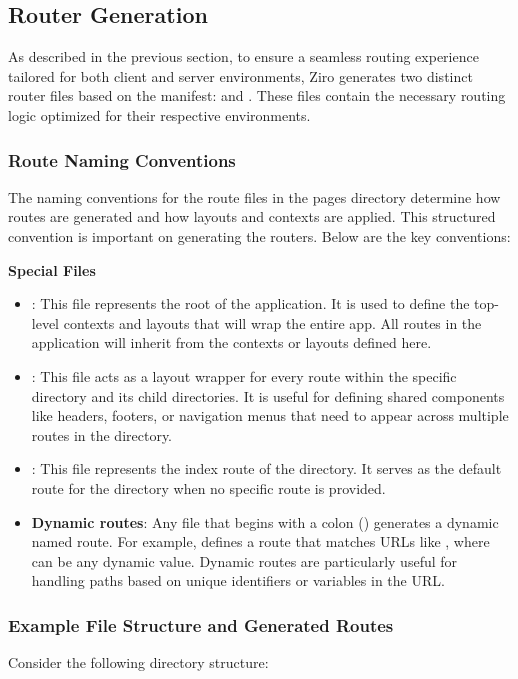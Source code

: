 \subsection{Router Generation}

As described in the previous section, to ensure a seamless routing experience tailored for both client and server environments, Ziro generates two distinct router files based on the manifest:  and . These files contain the necessary routing logic optimized for their respective environments.

\subsubsection{Route Naming Conventions}
The naming conventions for the route files in the pages directory determine how routes are generated and how layouts and contexts are applied. This structured convention is important on generating the routers. Below are the key conventions:

\textbf{Special Files}
\begin{itemize}
	\item {}: This file represents the root of the application. It is used to define the top-level contexts and layouts that will wrap the entire app. All routes in the application will inherit from the contexts or layouts defined here.
	\item {}: This file acts as a layout wrapper for every route within the specific directory and its child directories. It is useful for defining shared components like headers, footers, or navigation menus that need to appear across multiple routes in the directory.
	\item {}: This file represents the index route of the directory. It serves as the default route for the directory when no specific route is provided.
	\item \textbf{Dynamic routes}: Any file that begins with a colon (\cc{:}) generates a dynamic named route. For example,  defines a route that matches URLs like , where  can be any dynamic value. Dynamic routes are particularly useful for handling paths based on unique identifiers or variables in the URL.
\end{itemize}

\subsubsection{Example File Structure and Generated Routes}
Consider the following directory structure:

